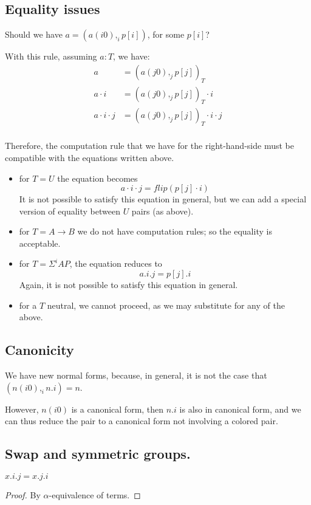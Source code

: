 \documentclass[10pt,a4paper]{article}
\newcommand\CC[4]{(#2,_{#1} #3)_{#4}}
\newcommand\CSig[1]{\Sigma^{#1}}
\newcommand\param[1]{\!\cdot\!#1}
\begin{document}
\subsection{Equality issues}

Should we have $a = (a(i0),_i p[i])$, for some $p[i]$?

With this rule, assuming $a:T$, we have:
\begin{align*}
  a &= \CC j {a(j0)} {p[j]} T \\
  a \param i &= \CC j {a(j0)} {p[j]} T \param i \\
  a \param i \param j &= \CC j {a(j0)} {p[j]} T \param i \param j\\
\end{align*}

Therefore, the computation rule that we have for the right-hand-side must be
compatible with the equations written above.

\begin{itemize}
\item 
for $T = U$ the equation becomes
$$a \param i \param j = flip (p[j] \param i)$$
It is not possible to satisfy this equation in general, but we can add a special version of equality between $U$ pairs (as above).
\item
for $T = A → B$ we do not have computation rules; so the equality is acceptable.
\item
for $T = \CSig i A P$, the equation reduces to
\[
a.i.j = p[j].i
\]
Again, it is not possible to satisfy this equation in general.
\item
for a $T$ neutral, we cannot proceed, as we may substitute for any of the above.
\end{itemize}


\subsection{Canonicity}

We have new normal forms, because, in general, it is not the case that $(n(i0),_i n.i) = n$.

However, $n(i0)$ is a canonical form, then $n.i$ is also in canonical form, and we can thus
reduce the pair to a canonical form not involving a colored pair.


\subsection{Swap and symmetric groups.}

\begin{lemma}\label{lem:param-var}
  $x.i.j = x.j.i$
\end{lemma}
\begin{proof}
  By $α$-equivalence of terms.
\end{proof}
\end{document}
